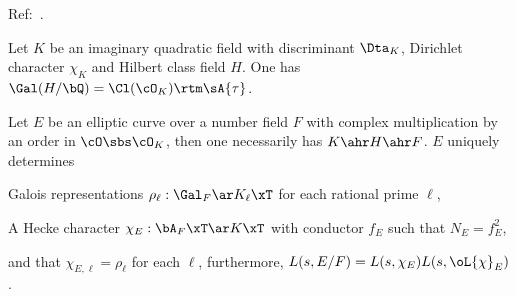 \documentclass[article, a4paper, twoside]{universal}
\begin{document}




Ref:~\cite{Gross1980,Cox2013}.

\begin{stp}
	Let $K$ be an imaginary quadratic field with discriminant $\Dta_{K}$, Dirichlet character $\chi_{K}$ and Hilbert class field $H$. One has $\Gal(H/\bQ)=\Cl(\cO_{K})\rtm\sA{\tau}$.
\end{stp}


\begin{thm}
	Let $E$ be an elliptic curve over a number field $F$ with complex multiplication by an order in $\cO\sbs\cO_{K}$, then one necessarily has $K\ahr H\ahr F$. $E$ uniquely determines
	\begin{itm}
		\item Galois representations $\rho_{\ell}:\Gal_{F}\ar K_{\ell}\xT$ for each rational prime $\ell$,
		\item A Hecke character $\chi_{E}:\bA_{F}\xT\ar K\xT$ with conductor $f_{E}$ such that $N_{E}=f_{E}^{2}$,
	\end{itm}
	and that $\chi_{E,\ell}=\rho_{\ell}$ for each $\ell$, furthermore, $L(s,E/F)=L(s,\chi_{E})L(s,\oL{\chi}_{E})$.
\end{thm}
\end{document}
